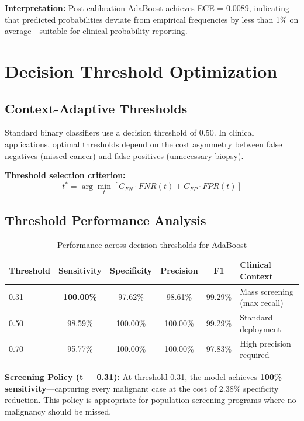 \documentclass[11pt,a4paper]{article}
\begin{document}
\textbf{Interpretation:} Post-calibration AdaBoost achieves ECE = 0.0089, indicating that predicted probabilities deviate from empirical frequencies by less than 1\% on average---suitable for clinical probability reporting.

\section{Decision Threshold Optimization}

\subsection{Context-Adaptive Thresholds}

Standard binary classifiers use a decision threshold of 0.50. In clinical applications, optimal thresholds depend on the cost asymmetry between false negatives (missed cancer) and false positives (unnecessary biopsy).

\textbf{Threshold selection criterion:}
\begin{equation}
t^* = \arg\min_t \left[ C_{FN} \cdot FNR(t) + C_{FP} \cdot FPR(t) \right]
\end{equation}

\subsection{Threshold Performance Analysis}

\begin{table}[H]
\centering
\caption{Performance across decision thresholds for AdaBoost}
\small
\begin{tabular}{lccccl}
\toprule
\textbf{Threshold} & \textbf{Sensitivity} & \textbf{Specificity} & \textbf{Precision} & \textbf{F1} & \textbf{Clinical Context} \\
\midrule
0.31 & \textbf{100.00\%} & 97.62\% & 98.61\% & 99.29\% & Mass screening (max recall) \\
0.50 & 98.59\% & 100.00\% & 100.00\% & 99.29\% & Standard deployment \\
0.70 & 95.77\% & 100.00\% & 100.00\% & 97.83\% & High precision required \\
\bottomrule
\end{tabular}
\label{tab:thresholds}
\end{table}

\textbf{Screening Policy (t = 0.31):} At threshold 0.31, the model achieves \textbf{100\% sensitivity}---capturing every malignant case at the cost of 2.38\% specificity reduction. This policy is appropriate for population screening programs where no malignancy should be missed.
\end{document}
